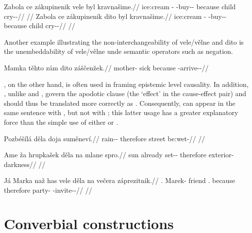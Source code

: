 \pex
\a\begingl
  \gla Zabola ce zákupinenik vele byl kravnašime.//
  \glb ice:cream \Dem{}-\Acc{} \Neg{}-buy-\Pv{}-\Pf{} because child cry-\Av{}-\Prog{}//
  \glft {}//
\endgl
\a\begingl
  \gla Zabola ce zákupinenik dito byl kravnašime.//
  \glb ice:cream \Dem{}-\Acc{} \Neg{}-buy-\Pv{}-\Pf{} because child cry-\Av{}-\Prog{}//
  \glft {}//
\endgl
\a {}
\a \ljudge{*}
\a {} 
\a {}
\xe 

Another example illustrating the non-interchangeability of vele/vělne and dito is the unembeddability of vele/vělne unde semantic operators such as negation.

\pex
\a\begingl
  \gla Mamka těhto zám dito záščenžek.//
  \glb mother-\Dim{} sick \Neg{} because \Neg{}-arrive-\Av{}-\Pf{}//
\endgl
\a \ljudge{*}
\xe

, on the other hand, is often used in framing epistemic level causality. In addition, , unlike  and , govern the apodotic clause (the `effect' in the cause-effect pair) and should thus be translated more correctly as . Consequently,  can appear in the same sentence with , but not with ; this latter usage has a greater explanatory force than the simple use of either  or .

\pex
\begingl
  \gla Pozbéšílá děla doja suměneví.//
  \glb rain-\Av{}-\SubjI{} therefore street be:wet-\Cont{}//
  \glft {}//
\endgl
\xe

\pex
\begingl
  \gla Ame ža hrupkašek děla na mlane spro.//
  \glb sun already set-\Av{}-\Pf{} therefore \Loc{} exterior-\Acc{} darkness//
  \glft {}//
\endgl
\xe


\pex
\begingl
  \gla J\'a Marka naž has vele děla na ve\v{c}era z\'aprezitnik.//
  \glb \Second{}\Sg{}.\Str{} Marek-\Acc{} friend \Cop.\Neg{} because therefore \Loc{} party-\Acc{} \Neg{}-invite-\Pv{}-\Pf{}//
  \glft {}//
\endgl
\xe




\section{Converbial constructions}\label{converbs-syntax}

